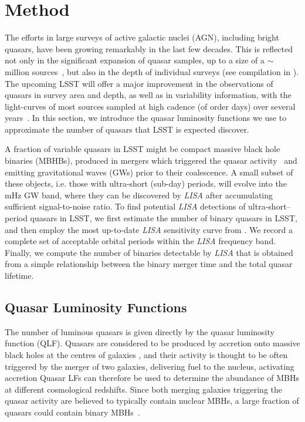 \documentclass[fleqn,usenatbib]{mnras}
\begin{document}
\section{Method} \label{sec:method}

The efforts in large surveys of active galactic nuclei (AGN), including bright quasars, have been growing remarkably in the last few decades. This is reflected not only in the significant expansion of quasar samples, up to a size of a $\sim$ million sources~\citep{Flesch2019},
but also in the depth of individual surveys (see compilation in \citealt{Kulkarni2019}). The upcoming LSST will offer a major improvement in the observations of quasars in survey area and depth, as well as in variability information, with the light-curves of most sources sampled at high cadence (of order days) over several years~\citep{LSSTScienceCollaboration2009,Ivezic2019}.
In this section, we introduce the quasar luminosity functions we use to approximate the number of quasars that LSST is expected discover. 

A fraction of variable quasars in LSST might be compact massive black hole binaries (MBHBs), produced in mergers which triggered the quasar activity~\citep{KauffmannHaehnelt2000,Haiman2009a}
and emitting gravitational waves (GWs) prior to their coalescence. A small subset of these objects, i.e. those with ultra-short (sub-day) periods, will evolve into the mHz GW band, where they can be discovered by {\it LISA} after accumulating sufficient signal-to-noise ratio.
To find potential {\it LISA} detections of ultra-short--period quasars in LSST, we first estimate the number of binary quasars in LSST, and then employ the most up-to-date {\it LISA} sensitivity curve from \citealt{Robson2019}. We record a complete set of acceptable orbital periods within the {\it LISA} frequency band. Finally, we compute the number of binaries detectable by {\it LISA} that is obtained from a simple relationship between the binary merger time and the total quasar lifetime. 

\subsection{Quasar Luminosity Functions} \label{sec:QLF}

The number of luminous quasars is given directly by the quasar luminosity function (QLF). Quasars are considered to be produced by accretion onto massive black holes at the centres of galaxies \citep{Lynden1969}, and their activity is thought to be often triggered by the merger of two galaxies, delivering fuel to the nucleus, activating accretion \citep[e.g.][]{BarnesHernquist1991}
Quasar LFs can therefore be used to determine the abundance of MBHs at different cosmological redshifts. 
Since both merging galaxies triggering the quasar activity are believed to typically contain nuclear MBHs, a large fraction of quasars could contain binary MBHs~\citep[e.g.][]{Haiman2009a,Dotti+2015}.  
\end{document}
